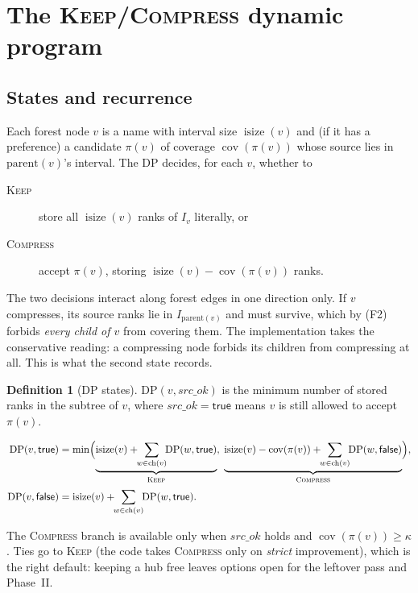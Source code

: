 \documentclass[11pt,a4paper]{article}
\theoremstyle{definition}
\newtheorem{definition}{Definition}
\theoremstyle{plain}
\theoremstyle{remark}
\newcommand{\cov}{\operatorname{cov}}
\newcommand{\isize}{\operatorname{isize}}
\newcommand{\pref}{\pi}
\newcommand{\KEEP}{\textnormal{\textsc{Keep}}}
\newcommand{\COMP}{\textnormal{\textsc{Compress}}}
\begin{document}
\section{\texorpdfstring{The \KEEP/\COMP{} dynamic program}{The KEEP/COMPRESS dynamic program}}
\label{sec:dp}

\subsection{States and recurrence}

Each forest node $v$ is a name with interval size $\isize(v)$ and (if it
has a preference) a candidate $\pref(v)$ of coverage $\cov(\pref(v))$
whose source lies in $\mathrm{parent}(v)$'s interval. The DP decides,
for each $v$, whether to
\begin{description}
\item[\KEEP] store all $\isize(v)$ ranks of $I_v$ literally, or
\item[\COMP] accept $\pref(v)$, storing $\isize(v) - \cov(\pref(v))$
  ranks.
\end{description}
The two decisions interact along forest edges in one direction only. If
$v$ compresses, its source ranks lie in $I_{\mathrm{parent}(v)}$ and must
survive, which by (F2) forbids \emph{every child of $v$} from covering
them. The implementation takes the conservative reading: a compressing
node forbids its children from compressing at all. This is what the
second state records.

\begin{definition}[DP states]
$\mathrm{DP}(v, \mathit{src\_ok})$ is the minimum number of stored ranks
in the subtree of $v$, where $\mathit{src\_ok} = \mathsf{true}$ means
$v$ is still allowed to accept $\pref(v)$.
\end{definition}

\begin{align}
  \mathrm{DP}(v,\mathsf{true}) &= \min\Bigl(
    \underbrace{\isize(v) + \!\!\sum_{w \in \mathrm{ch}(v)}\!\!
      \mathrm{DP}(w,\mathsf{true})}_{\KEEP},\;
    \underbrace{\isize(v) - \cov(\pref(v)) + \!\!\sum_{w \in \mathrm{ch}(v)}\!\!
      \mathrm{DP}(w,\mathsf{false})}_{\COMP}
  \Bigr),
  \label{eq:dptrue}\\[2pt]
  \mathrm{DP}(v,\mathsf{false}) &= \isize(v) + \!\!\sum_{w \in \mathrm{ch}(v)}\!\!
      \mathrm{DP}(w,\mathsf{true}).
  \label{eq:dpfalse}
\end{align}

The \COMP{} branch is available only when $\mathit{src\_ok}$ holds and
$\cov(\pref(v)) \ge \kappa$. Ties go to \KEEP{} (the code takes \COMP{}
only on \emph{strict} improvement), which is the right default: keeping
a hub free leaves options open for the leftover pass and Phase~II.
\end{document}
